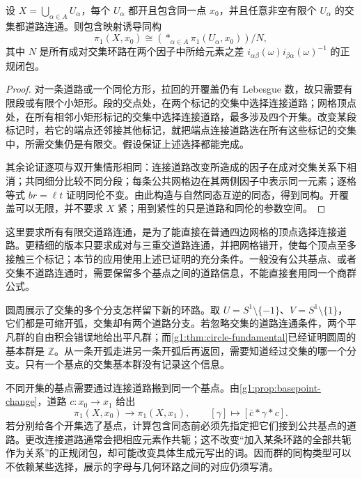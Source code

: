 \begin{corollary}\label{g1:cor:many-set-van-kampen}
	设 \(X=\bigcup_{\alpha\in A}U_\alpha\)，每个 \(U_\alpha\) 都开且包含同一点 \(x_0\)，并且任意非空有限个 \(U_\alpha\) 的交集都道路连通。则包含映射诱导同构
	\[
		\pi_1(X,x_0)\cong
		\left(\mathop{*}_{\alpha\in A}\pi_1(U_\alpha,x_0)\right)\big/N,
	\]
	其中 \(N\) 是所有成对交集环路在两个因子中所给元素之差
	\(i_{\alpha\beta}(\omega)i_{\beta\alpha}(\omega)^{-1}\) 的正规闭包。
\end{corollary}
\begin{proof}
	对一条道路或一个同伦方形，拉回的开覆盖仍有 Lebesgue 数，故只需要有限段或有限个小矩形。段的交点处，在两个标记的交集中选择连接道路；网格顶点处，在所有相邻小矩形标记的交集中选择连接道路，最多涉及四个开集。改变某段标记时，若它的端点还邻接其他标记，就把端点连接道路选在所有这些标记的交集中，所需交集仍是有限交。假设保证上述选择都能完成。

	其余论证逐项与双开集情形相同：连接道路改变所造成的因子在成对交集关系下相消；共同细分比较不同分段；每条公共网格边在其两侧因子中表示同一元素；逐格等式 \(br=\ell t\) 证明同伦不变。由此构造与自然同态互逆的同态，得到同构。开覆盖可以无限，并不要求 \(X\) 紧；用到紧性的只是道路和同伦的参数空间。
\end{proof}

这里要求所有有限交道路连通，是为了能直接在普通四边网格的顶点选择连接道路。更精细的版本只要求成对与三重交道路连通，并把网格错开，使每个顶点至多接触三个标记；本节的应用使用上述已证明的充分条件。一般没有公共基点、或者交集不道路连通时，需要保留多个基点之间的道路信息，不能直接套用同一个商群公式。

圆周展示了交集的多个分支怎样留下新的环路。取 \(U=S^1\setminus\{-1\}\)、\(V=S^1\setminus\{1\}\)，它们都是可缩开弧，交集却有两个道路分支。若忽略交集的道路连通条件，两个平凡群的自由积会错误地给出平凡群；而\cref{g1:thm:circle-fundamental}已经证明圆周的基本群是 \(\mathbb Z\)。从一条开弧走进另一条开弧后再返回，需要知道经过交集的哪一个分支。只有一个基点的交集基本群没有记录这个信息。

不同开集的基点需要通过连接道路搬到同一个基点。由\cref{g1:prop:basepoint-change}，道路 \(c:x_0\to x_1\) 给出
\[
	\pi_1(X,x_0)\longrightarrow\pi_1(X,x_1),\qquad
	[\gamma]\longmapsto[\bar c*\gamma*c].
\]
若分别给各个开集选了基点，计算包含同态前必须先指定把它们接到公共基点的道路。更改连接道路通常会把相应元素作共轭；这不改变“加入某条环路的全部共轭作为关系”的正规闭包，却可能改变具体生成元写出的词。因而群的同构类型可以不依赖某些选择，展示的字母与几何环路之间的对应仍须写清。

